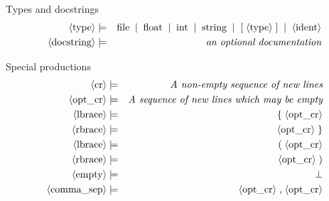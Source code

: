 Types and docstrings
\begin{eqnarray*}
  \pn{type} &\pp&
    \sm{file} \oo
    \sm{float} \oo
    \sm{int} \oo
    \sm{string} \oo
    \sm{[} \ww
    \pn{type} \ww
    \sm{]} \oo
    \pn{ident} \\
  \pn{docstring} &\pp&
    \sd{an optional documentation} \\
\end{eqnarray*}

Special productions
\begin{eqnarray*}
  \pn{cr} &\pp&
    \sd{A non-empty sequence of new lines} \\
  \pn{opt{\textunderscore}cr} &\pp&
    \sd{A sequence of new lines which may be empty} \\
  \pn{lbrace} &\pp&
    \sm{\{} \ww
    \pn{opt{\textunderscore}cr} \\
  \pn{rbrace} &\pp&
    \pn{opt{\textunderscore}cr} \ww
    \sm{\}} \\
  \pn{lbrace} &\pp&
    \sm{(} \ww
    \pn{opt{\textunderscore}cr} \\
  \pn{rbrace} &\pp&
    \pn{opt{\textunderscore}cr} \ww
    \sm{)} \\
  \pn{empty} &\pp&
    \nn \\
  \pn{comma{\textunderscore}sep} &\pp&
    \pn{opt{\textunderscore}cr} \ww
    \sm{,} \ww
    \pn{opt{\textunderscore}cr} \\
\end{eqnarray*}
